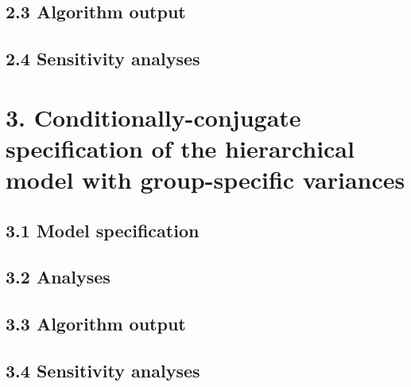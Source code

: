 \documentclass[]{article}
\begin{document}
\subsection{2.3 Algorithm output} \subsection{2.4 Sensitivity analyses}

\newpage \section{3. Conditionally-conjugate specification of the hierarchical model with group-specific variances}
\subsection{3.1 Model specification} \subsection{3.2 Analyses}
\subsection{3.3 Algorithm output} \subsection{3.4 Sensitivity analyses}
\end{document}
